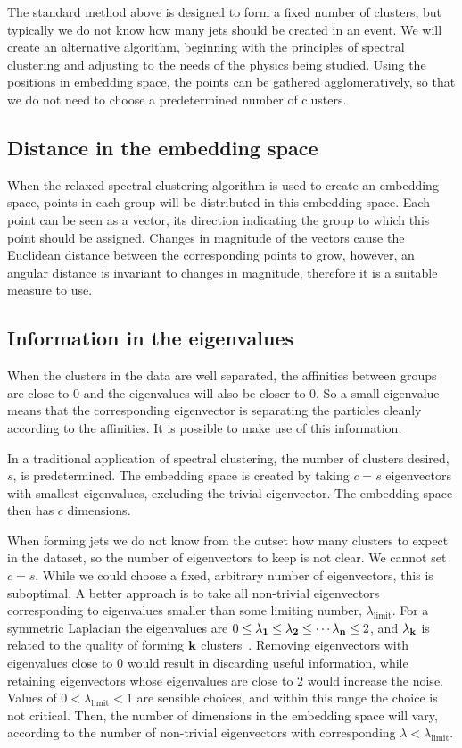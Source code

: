 The standard method above is designed to form a fixed number of clusters,
but typically we do not know how many jets should be created in an event.
We will create an alternative algorithm, beginning with the principles of
spectral clustering and adjusting to the needs of the physics being studied.
Using the positions in embedding space, the points can be gathered agglomeratively,
so that we do not need to choose a predetermined number of clusters.

\subsection{Distance in the embedding space}\label{sec:embedding_distance}
When the relaxed spectral clustering algorithm is used to create an embedding space,
points in each group will be distributed in this embedding space.
Each point can be seen as a vector, its direction  indicating the group to which this point should be assigned.
Changes in magnitude of the vectors cause the Euclidean distance between the corresponding points to grow,
however, an angular distance is invariant to changes in magnitude,
 therefore it  is a suitable measure to use.

\subsection{Information in the eigenvalues}\label{sec:eig_norm}
When the clusters in the data are well separated,
the affinities between groups are close to \(0\)
and the eigenvalues will also be closer to \(0\).
So a small eigenvalue means that the corresponding eigenvector
is separating the particles cleanly according to the affinities.
It is possible to make use of this information.

In a traditional application of spectral clustering, the number of clusters desired, \(s\), is predetermined.
The embedding space is created by taking \(c=s\) eigenvectors with smallest eigenvalues, excluding the trivial eigenvector.
The embedding space then has \(c\) dimensions.

When forming jets we do not know from the outset how many clusters to expect in the dataset,
so the number of eigenvectors to keep is not clear.
We cannot set \(c=s\).
While we could choose a fixed, arbitrary number of eigenvectors, this is suboptimal.
A better approach is to take all non-trivial eigenvectors corresponding to eigenvalues
smaller than some limiting number, \(\lambda_\text{limit}\).
For a symmetric Laplacian the eigenvalues are \(0 \leq \lambda_{\textbf{1}} \leq \lambda_{\textbf{2}} \leq \cdots \lambda_{\textbf{n}} \leq 2\),
and \(\lambda_{\textbf{k}}\) is related to the quality of forming \(\textbf{k}\)
clusters~\cite{JamesRLee:2014_unfound736}.
Removing eigenvectors with eigenvalues close to \(0\) would result
in discarding useful information, while retaining eigenvectors 
whose eigenvalues are close to \(2\) would increase the noise.
Values of \(0 < \lambda_{\mathrm{limit}} < 1\) are sensible choices,
and within this range the choice is not critical.
Then, the number of dimensions in the embedding space will vary,
according to the number of non-trivial eigenvectors with corresponding \(\lambda < \lambda_\text{limit}\).

